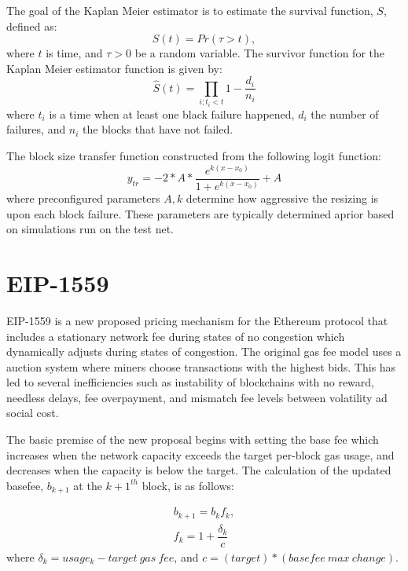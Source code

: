 \documentclass[peerreview]{ieeesyscoin}
\begin{document}
The goal of the Kaplan Meier estimator is to estimate the survival function, $S$, defined as:
\begin{equation}
S(t) = Pr(\tau > t),
\end{equation}
where $t$ is time, and  $\tau > 0$ be a random variable. The survivor function for the Kaplan Meier estimator function is given by:
\begin{equation}
\hat{S}(t) = \prod_{i; t_{i} < t} 1- \frac{d_{i}}{n_{i}}
\end{equation}
where $t_{i}$ is a time when at least one black failure happened, $d_{i}$ the number of failures, and $n_{i}$ the blocks that have not failed. 

The block size transfer function constructed from the following logit function:
\begin{equation}
y_{tr} = -2*A*\frac{e^{k(x-x_{0})}}{1+e^{k(x-x_{0})}} + A
\end{equation}
where preconfigured parameters ${A,k}$  determine how aggressive the resizing is upon each block failure. These parameters are typically determined aprior based on simulations run on the test net. 

\section{EIP-1559}

EIP-1559 is a new proposed pricing mechanism for the Ethereum protocol that includes a stationary network fee during states of no congestion which dynamically adjusts during states of congestion. The original gas fee model uses a auction system where miners choose transactions with the highest bids. This has led to several inefficiencies such as instability of blockchains with no reward, needless delays, fee overpayment, and mismatch fee levels between volatility ad social cost.

The basic premise of the new proposal begins with setting the base fee which increases when the network capacity exceeds the target per-block gas usage, and decreases when the capacity is below the target. The calculation of the updated basefee, $b_{k+1}$ at the $k+1^{th}$ block,  is as follows:

\begin{eqnarray} \label{eq:eip1559}
b_{k+1} = b_{k} f_{k}, \\
f_{k} = 1 + \dfrac{\delta_{k}}{c}
\end{eqnarray}
where $\delta_{k} = usage_{k} - target~gas~fee$, and $c = (target)*(basefee~max~change)$.
\end{document}
